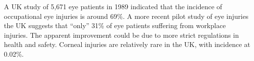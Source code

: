 A UK study of 5,671 eye patients in 1989 indicated that the incidence of
occupational eye injuries is around 69\%.\cite{macewen1989eye} A more
recent pilot study of eye injuries the UK suggests that \enquote{only} 31\%
of eye patients suffering from workplace injuries.\cite{thompson2009occupational}
The apparent improvement could be due to more strict regulations in health
and safety. Corneal injuries are relatively rare in the UK, with incidence at
0.02\%.\cite{macdonald2009surveillance}










